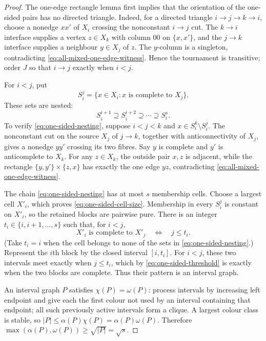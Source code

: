 \documentclass[11pt]{article}
\numberwithin{equation}{section}
\theoremstyle{plain}
\theoremstyle{definition}
\begin{document}
\begin{proof}
The one-edge rectangle lemma first implies that the orientation of
the one-sided pairs has no directed triangle.  Indeed, for a directed
triangle $i\to j\to k\to i$, choose a nonedge $xx'$ of $X_i$ crossing
the nonconstant $i\to j$ cut.  The $k\to i$ interface supplies a vertex
$z\in X_k$ with column $00$ on $\{x,x'\}$, and the $j\to k$ interface
supplies a neighbour $y\in X_j$ of $z$.  The $y$-column is a singleton,
contradicting \eqref{eq:all-mixed-one-edge-witness}.  Hence the
tournament is transitive; order $J$ so
that $i\to j$ exactly when $i<j$.

For $i<j$, put
\[
 S_i^j=\{x\in X_i:x\text{ is complete to }X_j\}.
\]
These sets are nested:
\begin{equation}
             S_i^{i+1}\supseteq S_i^{i+2}\supseteq\cdots
                         \supseteq S_i^s.
 \label{eq:one-sided-nesting}
\end{equation}
To verify \eqref{eq:one-sided-nesting}, suppose $i<j<k$ and
$x\in S_i^k\setminus S_i^j$.  The nonconstant cut on the source
$X_j$ of $j\to k$, together with anticonnectivity of $X_j$, gives a
nonedge $yy'$ crossing its two fibres.  Say $y$ is complete and $y'$ is
anticomplete to $X_k$.  For any $z\in X_k$, the outside pair $x,z$ is
adjacent, while the rectangle
$\{y,y'\}\times\{z,x\}$ has exactly the one edge $yz$, contradicting
\eqref{eq:all-mixed-one-edge-witness}.

The chain \eqref{eq:one-sided-nesting} has at most $s$ membership cells.
Choose a largest cell $X'_i$, which proves
\eqref{eq:one-sided-cell-size}.  Membership in every $S_i^j$ is constant on
$X'_i$, so the retained blocks are pairwise pure.  There is an integer
$t_i\in\{i,i+1,\ldots,s\}$ such that, for $i<j$,
\begin{equation}
             X'_i\text{ is complete to }X'_j
                    \quad\Longleftrightarrow\quad j\leq t_i.
 \label{eq:one-sided-threshold}
\end{equation}
(Take $t_i=i$ when the cell belongs to none of the sets in
\eqref{eq:one-sided-nesting}.)
Represent the $i$th block by the closed interval $[i,t_i]$.  For
$i<j$, these two intervals meet exactly when $j\leq t_i$, which by
\eqref{eq:one-sided-threshold}
is exactly when the two blocks are complete.  Thus their pattern is an
interval graph.

An interval graph $P$ satisfies
$\chi(P)=\omega(P)$: process intervals by increasing left endpoint and
give each the first colour not used by an interval containing that
endpoint; all such previously active intervals form a clique.  A largest
colour class is stable, so
$|P|\leq\alpha(P)\chi(P)=\alpha(P)\omega(P)$.  Therefore
$\max(\alpha(P),\omega(P))\geq\sqrt{|P|}=\sqrt{s}$.
\end{proof}
\end{document}
